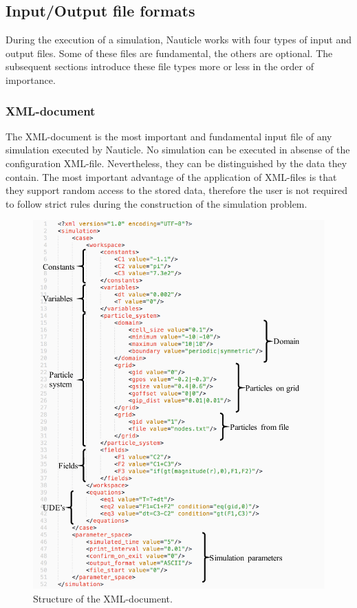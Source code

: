 \documentclass[a4paper,12pt,openany]{book}
\theoremstyle{break}
\begin{document}
\subsection{Input/Output file formats}
During the execution of a simulation, Nauticle works with four types of input and output files. Some of these files are fundamental, the others are optional. The subsequent sections introduce these file types more or less in the order of importance.
\subsubsection{XML-document} \label{sec:XML}
The XML-document is the most important and fundamental input file of any simulation executed by Nauticle. No simulation can be executed in absense of the configuration XML-file. Nevertheless, they can be distinguished by the data they contain. The most important advantage of the application of XML-files is that they support random access to the stored data, therefore the user is not required to follow strict rules during the construction of the simulation problem.\\
\begin{figure}[H]
  \includegraphics[scale=1.05]{xml_intro.pdf}
  \centering
  \caption{Structure of the XML-document.}
  \label{fig:xml_intro}
\end{figure}\vspace*{3pt}
\end{document}
